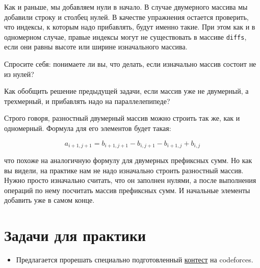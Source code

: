 
\begin{observation}
    Как и раньше, мы добавляем нули в начало. В случае двумерного массива мы добавили строку и столбец нулей. В качестве упражнения остается проверить, что индексы, к которым надо прибавлять, будут именно такие. При этом как и в одномерном случае, правые индексы могут не существовать в массиве \verb+diffs+, если они равны высоте или ширине изначального массива.
\end{observation}

\begin{exercise}
    Спросите себя: понимаете ли вы, что делать, если изначально массив состоит не из нулей?
\end{exercise}

\begin{exercise}
    Как обобщить решение предыдущей задачи, если массив уже не двумерный, а трехмерный, и прибавлять надо на параллелепипеде?
\end{exercise}

\begin{definition}
    Строго говоря, разностный двумерный массив можно строить так же, как и одномерный. Формула для его элементов будет такая:

    $$a_{i + 1, j + 1} = b_{i + 1, j + 1} - b_{i, j + 1} - b_{i + 1, j} + b_{i, j}$$

    что похоже на аналогичную формулу для двумерных префиксных сумм. Но как вы видели, на практике нам не надо изначально строить разностный массив. Нужно просто изначально считать, что он заполнен нулями, а после выполнения операций по нему посчитать массив префиксных сумм. И начальные элементы добавить уже в самом конце.
\end{definition}


\section{Задачи для практики}

\begin{itemize}
    \item Предлагается прорешать специально подготовленный \href{https://codeforces.com/group/1rv4rhCsHp/contest/319055}{контест} на codeforces.
\end{itemize}
